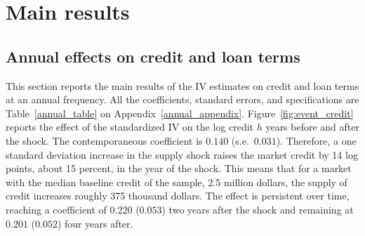 \documentclass[12pt]{article}
\begin{document}


\section{Main results} \label{results}

\subsection{Annual effects on credit and loan terms} \label{annual}

This section reports the main results of the IV estimates on credit and loan terms at an annual frequency. All the coefficients, standard errors, and specifications are Table~\ref{annual_table} on Appendix~\ref{annual_appendix}. Figure~\ref{fig:event_credit} reports the effect of the standardized IV on the log credit $h$ years before and after the shock. The contemporaneous coefficient is $0.140$ (s.e.\ $0.031$). Therefore, a one standard deviation increase in the supply shock raises the market credit by 14 log points, about 15 percent, in the year of the shock. This means that for a market with the median baseline credit of the sample, 2.5 million dollars, the supply of credit increases roughly 375 thousand dollars. The effect is persistent over time, reaching a coefficient of $0.220$ ($0.053$) two years after the shock and remaining at $0.201$ ($0.052$) four years after. 
\end{document}
